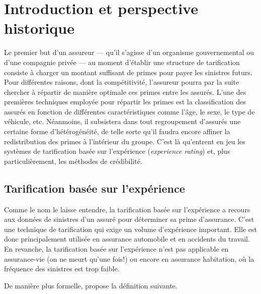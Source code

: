 
\chapter{Introduction et perspective historique}
\label{chap:introduction-historique}

Le premier but d'un assureur --- qu'il s'agisse d'un organisme
gouvernemental ou d'une compagnie privée --- au moment d'établir une
structure de tarification consiste à charger un montant suffisant de
primes pour payer les sinistres futurs. Pour différentes raisons, dont
la compétitivité, l'assureur pourra par la suite chercher à répartir
de manière optimale ces primes entre les assurés. L'une des premières
techniques employée pour répartir les primes est la classification des
assurés en fonction de différentes caractéristiques comme l'âge, le
sexe, le type de véhicule, etc. Néanmoins, il subsistera dans tout
regroupement d'assurés une certaine forme d'hétérogénéité, de telle
sorte qu'il faudra encore affiner la redistribution des primes à
l'intérieur du groupe. C'est là qu'entrent en jeu les systèmes de
tarification basée sur l'expérience (\emph{experience rating}) et,
plus particulièrement, les méthodes de crédibilité.

\section{Tarification basée sur l'expérience}
\label{sec:introduction-historique:experiencerating}

Comme le nom le laisse entendre, la tarification basée sur
l'expérience a recours aux données de sinistres d'un assuré pour
déterminer sa prime d'assurance. C'est une technique de tarification
qui exige un volume d'expérience important. Elle est donc
principalement utilisée en assurance automobile et en accidents du
travail. En revanche, la tarification basée sur l'expérience n'est pas
applicable en assurance-vie (on ne meurt qu'une fois!) ou encore en
assurance habitation, où la fréquence des sinistres est trop faible.

De manière plus formelle, \citep{Buhlmann:credibility:1969} propose la
définition suivante.

